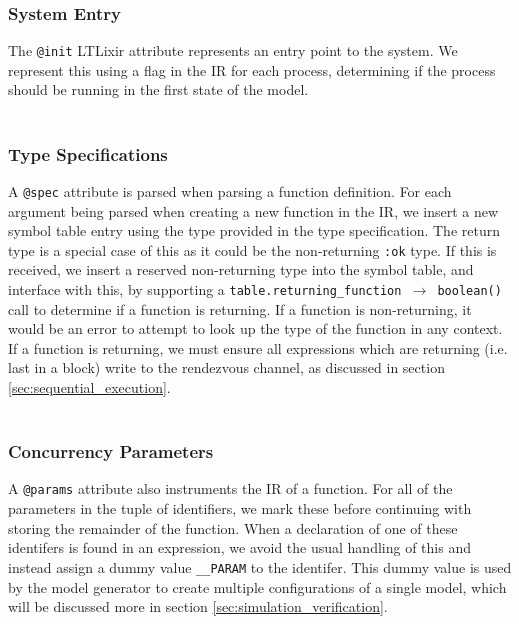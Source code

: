 \subsubsection{System Entry}
The \texttt{@init} LTLixir attribute represents an entry point to the system. We represent this using a flag in the IR for each process, determining if the process should be running in the first state of the model.
\\ \\
\subsubsection{Type Specifications}
A \texttt{@spec} attribute is parsed when parsing a function definition. For each argument being parsed when creating a new function in the IR, we insert a new symbol table entry using the type provided in the type specification. The return type is a special case of this as it could be the non-returning \texttt{:ok} type. If this is received, we insert a reserved non-returning type into the symbol table, and interface with this, by supporting a \texttt{table.returning\_function $\rightarrow$ boolean()} call to determine if a function is returning. If a function is non-returning, it would be an error to attempt to look up the type of the function in any context. If a function is returning, we must ensure all expressions which are returning (i.e. last in a block) write to the rendezvous channel, as discussed in section \ref{sec:sequential_execution}.
\\ \\
\subsubsection{Concurrency Parameters}
A \texttt{@params} attribute also instruments the IR of a function. For all of the parameters in the tuple of identifiers, we mark these before continuing with storing the remainder of the function. When a declaration of one of these identifers is found in an expression, we avoid the usual handling of this and instead assign a dummy value \texttt{\_\_PARAM} to the identifer. This dummy value is used by the model generator to create multiple configurations of a single model, which will be discussed more in section \ref{sec:simulation_verification}.
\\ \\

